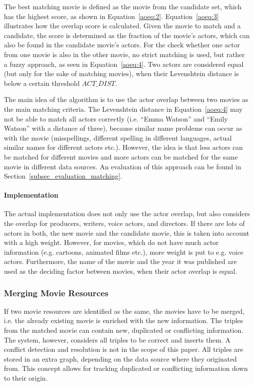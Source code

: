 The best matching movie is defined as the movie from the candidate set, which has the highest score, as shown in Equation~\ref{aoeq:2}.
Equation~\ref{aoeq:3} illustrates how the overlap score is calculated. Given the movie to match and a candidate, the score is determined as the fraction of the movie's actors, which can also be found in the candidate movie's actors.
For the check whether one actor from one movie is also in the other movie, no strict matching is used, but rather a fuzzy approach, as seen in Equation~\ref{aoeq:4}.
Two actors are considered equal (but only for the sake of matching movies), when their Levenshtein distance is below a certain threshold $ACT\_DIST$.

The main idea of the algorithm is to use the actor overlap between two movies as the main matching criteria.
The Levenshtein distance in Equation~\ref{aoeq:4} may not be able to match all actors correctly (i.e. ``Emma Watson'' and ``Emily Watson'' with a distance of three), because similar name problems can occur as with the movie (misspellings, different spelling in different languages, actual similar names for different actors etc.).
However, the idea is that less actors can be matched for different movies and more actors can be matched for the same movie in different data sources.
An evaluation of this approach can be found in Section~\ref{subsec_evaluation_matching}.

\paragraph{Implementation}
The actual implementation does not only use the actor overlap, but also considers the overlap for producers, writers, voice actors, and directors.
If there are lots of actors in both, the new movie and the candidate movie, this is taken into account with a high weight.
However, for movies, which do not have much actor information (e.g. cartoons, animated films etc.), more weight is put to e.g. voice actors.
Furthermore, the name of the movie and the year it was published are used as the deciding factor between movies, when their actor overlap is equal.

\subsubsection{Merging Movie Resources}

If two movie resources are identified as the same, the movies have to be merged, i.e. the already existing movie is enriched with the new information.
The triples from the matched movie can contain new, duplicated or conflicting information.
The system, however, considers all triples to be correct and inserts them.
A conflict detection and resolution is not in the scope of this paper.
All triples are stored in an extra graph, depending on the data source where they originated from.
This concept allows for tracking duplicated or conflicting information down to their origin.
